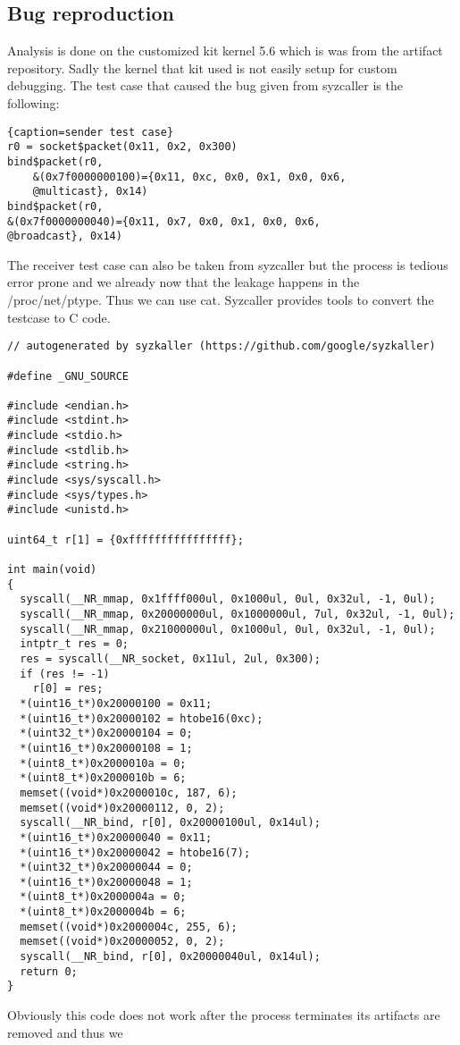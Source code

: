 \documentclass[10pt,twocolumn,a4paper]{article}
\begin{document}
\subsection{Bug reproduction}
Analysis is done on the customized kit kernel 5.6 which is was from the artifact repository\cite{2}.
Sadly the kernel that kit used is not easily setup for custom debugging.
The test case that caused the bug given from syzcaller is the following: 
\begin{lstlisting}{caption=sender test case}
r0 = socket$packet(0x11, 0x2, 0x300)
bind$packet(r0, 
    &(0x7f0000000100)={0x11, 0xc, 0x0, 0x1, 0x0, 0x6,
    @multicast}, 0x14)
bind$packet(r0, 
&(0x7f0000000040)={0x11, 0x7, 0x0, 0x1, 0x0, 0x6,
@broadcast}, 0x14)
\end{lstlisting}
The receiver test case can also be taken from syzcaller but the process is tedious error prone and
we already now that the leakage happens in the /proc/net/ptype. Thus we can use cat.
Syzcaller provides tools to convert the testcase to C code. 
\begin{lstlisting}
// autogenerated by syzkaller (https://github.com/google/syzkaller)

#define _GNU_SOURCE

#include <endian.h>
#include <stdint.h>
#include <stdio.h>
#include <stdlib.h>
#include <string.h>
#include <sys/syscall.h>
#include <sys/types.h>
#include <unistd.h>

uint64_t r[1] = {0xffffffffffffffff};

int main(void)
{
  syscall(__NR_mmap, 0x1ffff000ul, 0x1000ul, 0ul, 0x32ul, -1, 0ul);
  syscall(__NR_mmap, 0x20000000ul, 0x1000000ul, 7ul, 0x32ul, -1, 0ul);
  syscall(__NR_mmap, 0x21000000ul, 0x1000ul, 0ul, 0x32ul, -1, 0ul);
  intptr_t res = 0;
  res = syscall(__NR_socket, 0x11ul, 2ul, 0x300);
  if (res != -1)
    r[0] = res;
  *(uint16_t*)0x20000100 = 0x11;
  *(uint16_t*)0x20000102 = htobe16(0xc);
  *(uint32_t*)0x20000104 = 0;
  *(uint16_t*)0x20000108 = 1;
  *(uint8_t*)0x2000010a = 0;
  *(uint8_t*)0x2000010b = 6;
  memset((void*)0x2000010c, 187, 6);
  memset((void*)0x20000112, 0, 2);
  syscall(__NR_bind, r[0], 0x20000100ul, 0x14ul);
  *(uint16_t*)0x20000040 = 0x11;
  *(uint16_t*)0x20000042 = htobe16(7);
  *(uint32_t*)0x20000044 = 0;
  *(uint16_t*)0x20000048 = 1;
  *(uint8_t*)0x2000004a = 0;
  *(uint8_t*)0x2000004b = 6;
  memset((void*)0x2000004c, 255, 6);
  memset((void*)0x20000052, 0, 2);
  syscall(__NR_bind, r[0], 0x20000040ul, 0x14ul);
  return 0;
}
\end{lstlisting}
Obviously this code does not work after the process terminates its artifacts are removed and thus we
\end{document}
